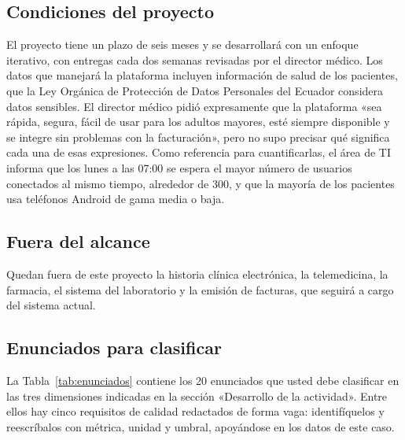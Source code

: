 \documentclass[11pt]{article}
\newcommand{\subseccion}[1]{\subsection{\textcolor{midblue}{#1}}}
\begin{document}
\subseccion{Condiciones del proyecto}
El proyecto tiene un plazo de seis meses y se desarrollará con un enfoque iterativo, con entregas cada dos semanas revisadas por el director médico. Los datos que manejará la plataforma incluyen información de salud de los pacientes, que la Ley Orgánica de Protección de Datos Personales del Ecuador considera datos sensibles. El director médico pidió expresamente que la plataforma «sea rápida, segura, fácil de usar para los adultos mayores, esté siempre disponible y se integre sin problemas con la facturación», pero no supo precisar qué significa cada una de esas expresiones. Como referencia para cuantificarlas, el área de TI informa que los lunes a las 07:00 se espera el mayor número de usuarios conectados al mismo tiempo, alrededor de 300, y que la mayoría de los pacientes usa teléfonos Android de gama media o baja.

\subseccion{Fuera del alcance}
Quedan fuera de este proyecto la historia clínica electrónica, la telemedicina, la farmacia, el sistema del laboratorio y la emisión de facturas, que seguirá a cargo del sistema actual.

\subseccion{Enunciados para clasificar}
La Tabla~\ref{tab:enunciados} contiene los 20 enunciados que usted debe clasificar en las tres dimensiones indicadas en la sección «Desarrollo de la actividad». Entre ellos hay cinco requisitos de calidad redactados de forma vaga: identifíquelos y reescríbalos con métrica, unidad y umbral, apoyándose en los datos de este caso.
\end{document}
